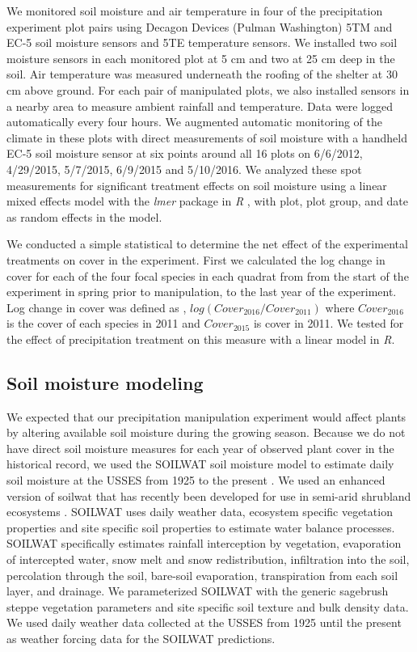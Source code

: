 \documentclass[11pt]{article}
\begin{document}
\begin{doublespacing}
We monitored soil moisture and air temperature in four of the precipitation experiment plot pairs using Decagon Devices (Pulman Washington) 5TM and EC-5 soil moisture sensors and 5TE temperature sensors.  We installed two soil moisture sensors in each monitored plot at 5 cm and two at 25 cm deep in the soil.  Air temperature was measured underneath the roofing of the shelter at 30 cm above ground. For each pair of manipulated plots, we also installed sensors in a nearby area to measure ambient rainfall and temperature. Data were logged automatically every four hours. We augmented automatic monitoring of the climate in these plots with direct measurements of soil moisture with a handheld EC-5 soil moisture sensor at six points around all 16 plots on 6/6/2012, 4/29/2015, 5/7/2015, 6/9/2015 and 5/10/2016. We analyzed these spot measurements for significant treatment effects on soil moisture using a linear mixed effects model with the \textit{lmer} package in \textit{R} \citep{bates}, with plot, plot group, and date as random effects in the model.    

We conducted a simple statistical to determine the net effect of the experimental treatments on cover in the experiment. First we calculated the log change in cover for each of the four focal species in each quadrat from from the start of the experiment in spring prior to manipulation, to the last year of the experiment. Log change in cover was defined as , $log(Cover_{2016}/Cover_{2011})$ where $Cover_{2016}$ is the cover of each species in 2011 and $Cover_{2015}$ is cover in 2011. We tested for the effect of precipitation treatment on this measure with a linear model in \textit{R}.

\subsection*{Soil moisture modeling}

We expected that our precipitation manipulation experiment would affect plants by altering available soil moisture during the growing season.  Because we do not have direct soil moisture measures for each year of observed plant cover in the historical record, we used the SOILWAT soil moisture model to estimate daily soil moisture at the USSES from 1925 to the present \citep{Parton_1978}. We used an enhanced version of soilwat that has recently been developed for use in semi-arid shrubland ecosystems \citep{Bradford}. SOILWAT uses daily weather data, ecosystem specific vegetation properties and site specific soil properties to estimate water balance processes. SOILWAT specifically estimates rainfall interception by vegetation, evaporation of intercepted water, snow melt and snow redistribution, infiltration into the soil, percolation through the soil, bare-soil evaporation, transpiration from each soil layer, and drainage. We parameterized SOILWAT with the generic sagebrush steppe vegetation parameters and site specific soil texture and bulk density data. We used daily weather data collected at the USSES from 1925 until the present as weather forcing data for the SOILWAT predictions.  


\end{doublespacing}
\end{document}
